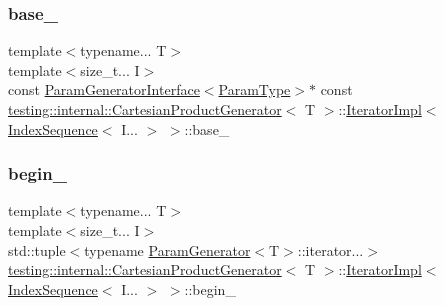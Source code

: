 \subsubsection{\texorpdfstring{base\+\_\+}{base\_}}
{\footnotesize\ttfamily template$<$typename... T$>$ \\
template$<$size\+\_\+t... I$>$ \\
const \hyperlink{classtesting_1_1internal_1_1ParamGeneratorInterface}{Param\+Generator\+Interface}$<$\hyperlink{classtesting_1_1internal_1_1CartesianProductGenerator_af27131157a9347f0c82420ca081ee7dd}{Param\+Type}$>$$\ast$ const \hyperlink{classtesting_1_1internal_1_1CartesianProductGenerator}{testing\+::internal\+::\+Cartesian\+Product\+Generator}$<$ T $>$\+::\hyperlink{classtesting_1_1internal_1_1CartesianProductGenerator_1_1IteratorImpl}{Iterator\+Impl}$<$ \hyperlink{structtesting_1_1internal_1_1IndexSequence}{Index\+Sequence}$<$ I... $>$ $>$\+::base\+\_\+\hspace{0.3cm}{\ttfamily [private]}}

\mbox{\label{classtesting_1_1internal_1_1CartesianProductGenerator_1_1IteratorImpl_3_01IndexSequence_3_01I_8_8_8_01_4_01_4_aae7fbddbf01df185226712ee2a38d410}} 
\subsubsection{\texorpdfstring{begin\+\_\+}{begin\_}}
{\footnotesize\ttfamily template$<$typename... T$>$ \\
template$<$size\+\_\+t... I$>$ \\
std\+::tuple$<$typename \hyperlink{classtesting_1_1internal_1_1ParamGenerator}{Param\+Generator}$<$T$>$\+::iterator...$>$ \hyperlink{classtesting_1_1internal_1_1CartesianProductGenerator}{testing\+::internal\+::\+Cartesian\+Product\+Generator}$<$ T $>$\+::\hyperlink{classtesting_1_1internal_1_1CartesianProductGenerator_1_1IteratorImpl}{Iterator\+Impl}$<$ \hyperlink{structtesting_1_1internal_1_1IndexSequence}{Index\+Sequence}$<$ I... $>$ $>$\+::begin\+\_\+\hspace{0.3cm}{\ttfamily [private]}}

